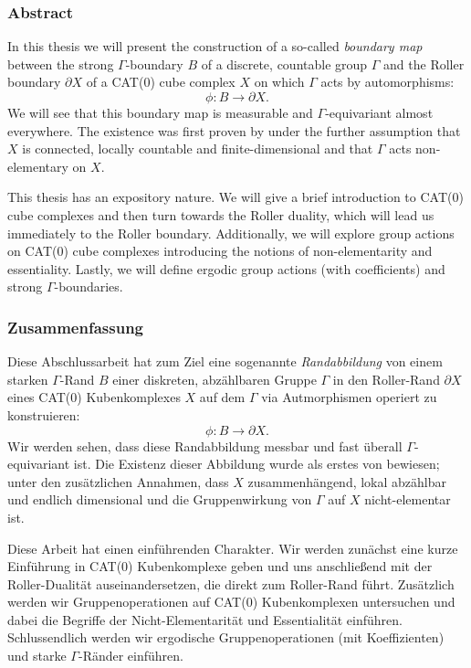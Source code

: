 \subsubsection*{Abstract}
%
\label{sec:abstract}

In this thesis we will present the construction of a so-called \emph{boundary map} between the strong \(\Gamma\)-boundary \(B\) of a discrete, countable group \(\Gamma\) and the Roller boundary \(\partial X\) of a CAT(0) cube complex \(X\) on which \(\Gamma\) acts by automorphisms:
\[
  \phi\colon B \to \partial X.
\]
We will see that this boundary map is measurable and \(\Gamma\)-equivariant almost everywhere. The existence was first proven by \textcite{MR3509968} under the further assumption that \(X\) is connected, locally countable and finite-dimensional and that \(\Gamma\) acts non-elementary on \(X\). 

This thesis has an expository nature. We will give a brief introduction to CAT(0) cube complexes and then turn towards the Roller duality, which will lead us immediately to the Roller boundary. Additionally, we will explore group actions on CAT(0) cube complexes introducing the notions of non-elementarity and essentiality. Lastly, we will define ergodic group actions (with coefficients) and strong \(\Gamma\)-boundaries.


\subsubsection*{Zusammenfassung}
\label{sec:Zusammenfassung}
Diese Abschlussarbeit hat zum Ziel eine sogenannte \emph{Randabbildung} von einem starken \(\Gamma\)-Rand \(B\) einer diskreten, abzählbaren Gruppe \(\Gamma\) in den Roller-Rand \(\partial X\) eines CAT(0) Kubenkomplexes \(X\) auf dem \(\Gamma\) via Autmorphismen operiert zu konstruieren:
\[
  \phi\colon B \to \partial X.
\]
Wir werden sehen, dass diese Randabbildung messbar und fast überall \(\Gamma\)-equivariant ist. Die Existenz dieser Abbildung wurde als erstes von \textcite{MR3509968} bewiesen; unter den zusätzlichen Annahmen, dass \(X\) zusammenhängend, lokal abzählbar und endlich dimensional und die Gruppenwirkung von \(\Gamma\) auf \(X\) nicht-elementar ist.

Diese Arbeit hat einen einführenden Charakter. Wir werden zunächst eine kurze Einführung in CAT(0) Kubenkomplexe geben und uns anschließend mit der Roller-Dualität auseinandersetzen, die direkt zum Roller-Rand führt. Zusätzlich werden wir Gruppenoperationen auf CAT(0) Kubenkomplexen untersuchen und dabei die Begriffe der Nicht-Elementarität und Essentialität einführen. Schlussendlich werden wir ergodische Gruppenoperationen (mit Koeffizienten) und starke \(\Gamma\)-Ränder einführen.


